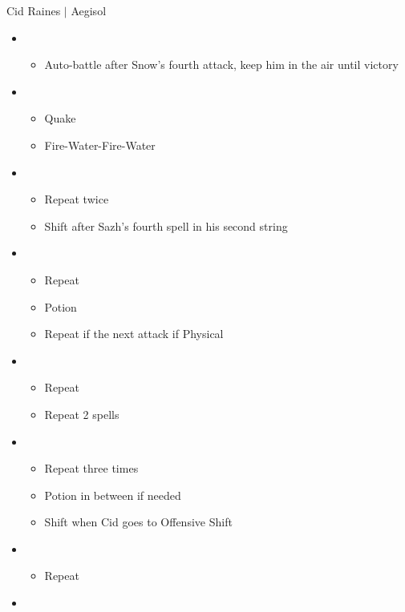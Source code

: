 \documentclass{report}
\begin{document}
\begin{battle}{Cid Raines $|$ Aegisol}
\begin{multicols}{2}
\begin{itemize}
\begin{itemize}
\begin{itemize}
        \end{itemize}
    \end{itemize}
    \item \sixth
    \begin{itemize}
        \item Auto-battle after Snow's fourth attack, keep him in the air until victory
    \end{itemize}
\end{itemize}
\columnbreak
\begin{itemize}
    \item \first
    \begin{itemize}
        \item Quake
        \item Fire-Water-Fire-Water
    \end{itemize}
    \item \third
    \begin{itemize}
        \item Repeat twice
        \item Shift after Sazh's fourth spell in his second string
    \end{itemize}
    \item \fourth
    \begin{itemize}
        \item Repeat
        \item Potion
        \item Repeat if the next attack if Physical
    \end{itemize}
    \item \fifth
    \begin{itemize}
        \item Repeat
        \item Repeat 2 spells
    \end{itemize}
    \item \second
    \begin{itemize}
        \item Repeat three times
        \item Potion in between if needed
        \item Shift when Cid goes to Offensive Shift
    \end{itemize}
    \item \third
    \begin{itemize}
        \item Repeat
    \end{itemize}
    \item \second

\end{itemize}
\end{multicols}
\end{battle}
\end{document}

